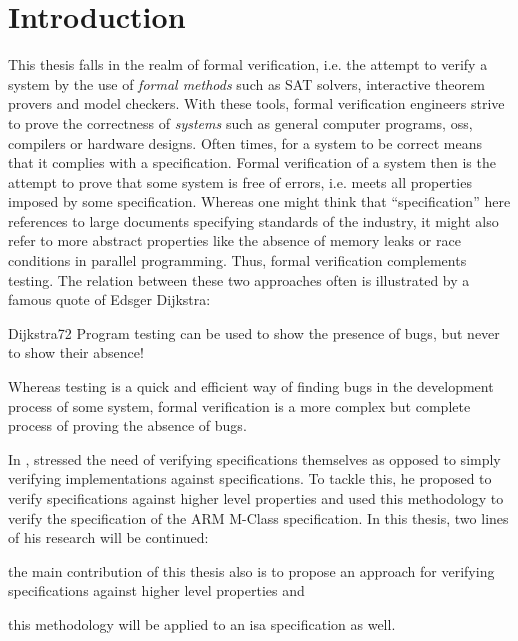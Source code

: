 
\section{Introduction}
\label{sec:introduction}

This thesis falls in the realm of formal verification, i.e. the attempt to verify a system by the use of \textit{formal methods} such as SAT solvers, interactive theorem provers and model checkers.
With these tools, formal verification engineers strive to prove the correctness of \textit{systems} such as general computer programs, \glspl{os}, compilers or hardware designs.
Often times, for a system to be correct means that it complies with a specification.
Formal verification of a system then is the attempt to prove that some system is free of errors, i.e. meets all properties imposed by some specification.
Whereas one might think that \enquote{specification} here references to large documents specifying standards of the industry, it might also refer to more abstract properties like the absence of memory leaks or race conditions in parallel programming.
Thus, formal verification complements testing.
The relation between these two approaches often is illustrated by a famous quote of Edsger Dijkstra:
\begin{displaycquote}[p.6]{Dijkstra72}
    Program testing can be used to show the presence of bugs, but never to show their absence!
\end{displaycquote}

Whereas testing is a quick and efficient way of finding bugs in the development process of some system, formal verification is a more complex but complete process of proving the absence of bugs.

In  \cite{Reid17}, \citeauthor{Reid17} stressed the need of verifying specifications themselves as opposed to simply verifying implementations against specifications.
To tackle this, he proposed to verify specifications against higher level properties and used this methodology to verify the specification of the ARM M-Class specification.
In this thesis, two lines of his research will be continued: \begin{enumerate*}[label=\alph*)]
    \item the main contribution of this thesis also is to propose an approach for verifying specifications against higher level properties and
    \item this methodology will be applied to an \gls{isa} specification as well.
\end{enumerate*}


